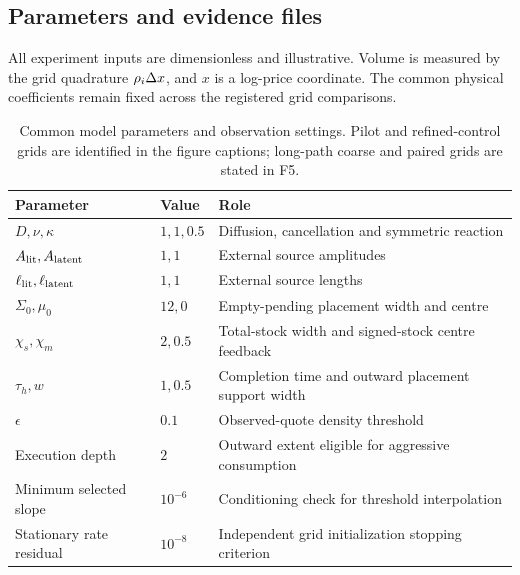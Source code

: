 \documentclass[11pt,a4paper]{article}
\begin{document}
\subsection{Parameters and evidence files}
All experiment inputs are dimensionless and illustrative. Volume is measured by the grid quadrature $\rho_i\Delta x$, and $x$ is a log-price coordinate. The common physical coefficients remain fixed across the registered grid comparisons.
\begin{table}[H]\centering\small
\caption{Common model parameters and observation settings. Pilot and refined-control grids are identified in the figure captions; long-path coarse and paired grids are stated in F5.}\label{tab:parameters}
\begin{tabularx}{\textwidth}{@{}l l Y@{}}\toprule
Parameter & Value & Role\\\midrule
$D,\nu,\kappa$ & $1,1,0.5$ & Diffusion, cancellation and symmetric reaction\\
$A_{\rm lit},A_{\rm latent}$ & $1,1$ & External source amplitudes\\
$\ell_{\rm lit},\ell_{\rm latent}$ & $1,1$ & External source lengths\\
$\Sigma_0,\mu_0$ & $12,0$ & Empty-pending placement width and centre\\
$\chi_s,\chi_m$ & $2,0.5$ & Total-stock width and signed-stock centre feedback\\
$\tau_h,w$ & $1,0.5$ & Completion time and outward placement support width\\
$\epsilon$ & $0.1$ & Observed-quote density threshold\\
Execution depth & $2$ & Outward extent eligible for aggressive consumption\\
Minimum selected slope & $10^{-6}$ & Conditioning check for threshold interpolation\\
Stationary rate residual & $10^{-8}$ & Independent grid initialization stopping criterion\\\bottomrule
\end{tabularx}\end{table}
\end{document}
